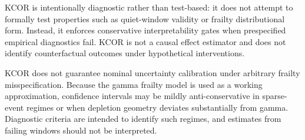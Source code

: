 \documentclass[
]{article}
\begin{document}
KCOR is intentionally diagnostic rather than test-based: it does not attempt to formally test properties such as quiet-window validity or frailty distributional form. Instead, it enforces conservative interpretability gates when prespecified empirical diagnostics fail. KCOR is not a causal effect estimator and does not identify counterfactual outcomes under hypothetical interventions.

KCOR does not guarantee nominal uncertainty calibration under arbitrary frailty misspecification. Because the gamma frailty model is used as a working approximation, confidence intervals may be mildly anti-conservative in sparse-event regimes or when depletion geometry deviates substantially from gamma. Diagnostic criteria are intended to identify such regimes, and estimates from failing windows should not be interpreted.
\end{document}
